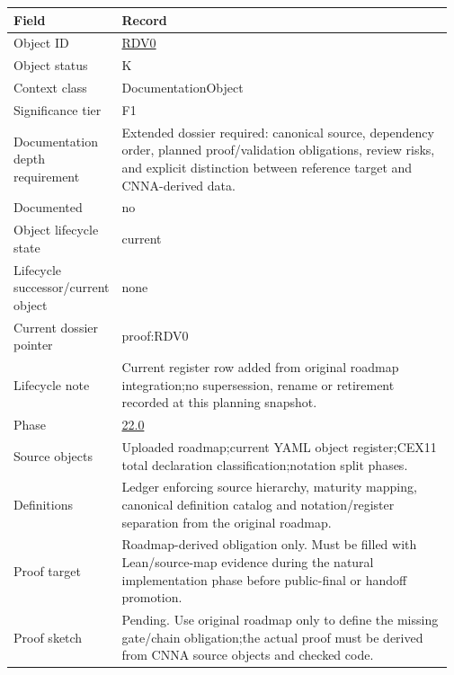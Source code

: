 \begin{longtable}{L{0.16\linewidth} L{0.81\linewidth}}
\hline
\textbf{Field} & \textbf{Record}\\
\hline
Object ID & \hyperlink{object-row-RDV0}{RDV0}\\
\hline\addlinespace[0.20em]
Object status & K\\
\hline\addlinespace[0.20em]
Context class & DocumentationObject\\
\hline\addlinespace[0.20em]
Significance tier & F1\\
\hline\addlinespace[0.20em]
Documentation depth requirement & Extended dossier required: canonical source, dependency order, planned proof/\allowbreak{}validation obligations, review risks, and explicit distinction between reference target and CNNA-derived data.\\
\hline\addlinespace[0.20em]
Documented & no\\
\hline\addlinespace[0.20em]
Object lifecycle state & current\\
\hline\addlinespace[0.20em]
Lifecycle successor/\allowbreak{}current object & none\\
\hline\addlinespace[0.20em]
Current dossier pointer & proof:RDV0\\
\hline\addlinespace[0.20em]
Lifecycle note & Current register row added from original roadmap integration;\newline no supersession, rename or retirement recorded at this planning snapshot.\\
\hline\addlinespace[0.20em]
Phase & \hyperlink{phase-row-22-0}{22.0}\\
\hline\addlinespace[0.20em]
Source objects & Uploaded roadmap;\newline current YAML object register;\newline CEX11 total declaration classification;\newline notation split phases.\\
\hline\addlinespace[0.20em]
Definitions & Ledger enforcing source hierarchy, maturity mapping, canonical definition catalog and notation/\allowbreak{}register separation from the original roadmap.\\
\hline\addlinespace[0.20em]
Proof target & Roadmap-derived obligation only. Must be filled with Lean/\allowbreak{}source-map evidence during the natural implementation phase before public-final or handoff promotion.\\
\hline\addlinespace[0.20em]
Proof sketch & Pending. Use original roadmap only to define the missing gate/\allowbreak{}chain obligation;\newline the actual proof must be derived from CNNA source objects and checked code.\\

\end{longtable}
